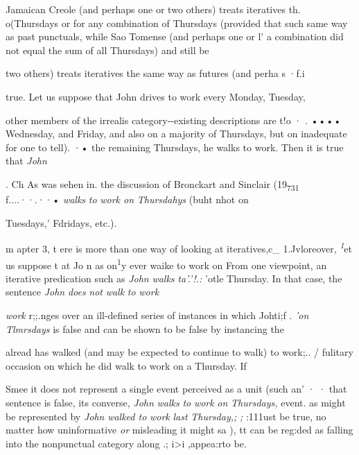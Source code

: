 
Jamaican Creole (and perhaps one or two others) treats iteratives th{\textquotedbl}{\textquotedbl}. o(Thursdays or for any combination of Thursdays (provided that such same way as past punctuals, while Sao Tomense (and perhaps one or l' a combination did not equal the sum of all Thursdays) and still be

two others) treats iteratives the same way as futures (and perha s ·f.i

true. Let us suppose that John drives to work every Monday, Tuesday,

other members of the irrealis category-{}-existing descriptions are t!o · . •••• Wednesday, and Friday, and also on a majority of Thursdays, but on inadequate for one to tell). ·• the remaining Thursdays, he walks to work. Then it is true that \textit{John}

. Ch As was sehen in. the discussion of Bronckart and Sinclair (19\textsubscript{7}\textsubscript{3}\textsubscript{1}\textsubscript{ }f....··.··• \textit{walks} \textit{to} \textit{w}\textit{ork on} \textit{Thursd}\textit{a}\textit{h}\textit{ys }(buht nhot on

Tuesdays,' Fdridays, etc.).

m apter 3, t ere is more than one way of looking at iteratives,c\_ 1.Jvloreover, \textit{\textsuperscript{1}}et us suppose t at Jo n as on\textsuperscript{1}y ever waike to work on From one viewpoint, an iterative predication such as \textit{John} \textit{wal}\textit{k}\textit{s} \textit{t}\textit{a}\textit{'}\textit{.}\textit{'!.: }'otle Thursday. In that case, the sentence \textit{John} \textit{does} \textit{not} \textit{walk} \textit{to} \textit{work}

\textit{work }r;;.nges over an ill-defined series of instances in which Johti;f . \textit{'}\textit{on} \textit{Tlmrsdays} is false and can be shown to be false by instancing the

alread has walked (and may be expected to continue to walk) to work;.. / fulitary occasion on which he did walk to work on a Thursday. If

Smee it does not represent a single event perceived as a unit (such an' · · that sentence is false, its converse, \textit{John} \textit{walks} \textit{to} \textit{work} \textit{on} \textit{Thursdays,} event. as might be represented by \textit{John} \textit{walked to} \textit{work} \textit{last} \textit{Thursday,;} \textit{; }:111ust be true, no matter how uninformative \textit{or} misleading it might sa ), tt can be reg:{\textquotedbl}ded as falling into the nonpunctual category along .; i{\textgreater}i ,appea:rto be.

